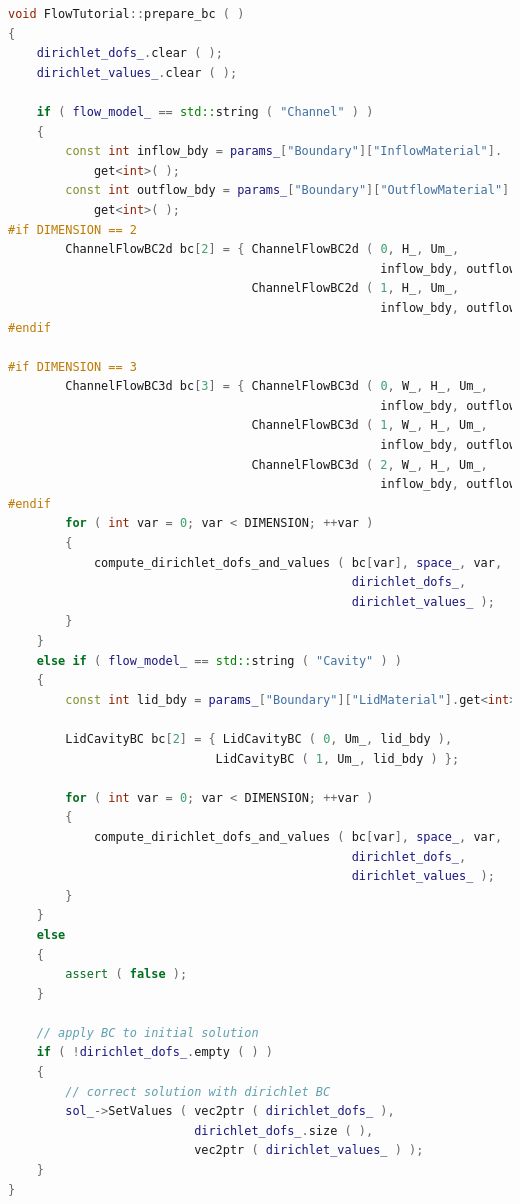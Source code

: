 \documentclass[a4paper, 11pt, twoside]{article}
\begin{document}
\begin{lstlisting}[language=C++, basicstyle={\footnotesize, \ttfamily}, keywordstyle=\color{blue},  numbers=none, tabsize=4]
void FlowTutorial::prepare_bc ( )
{
    dirichlet_dofs_.clear ( );
    dirichlet_values_.clear ( );

    if ( flow_model_ == std::string ( "Channel" ) )
    {
        const int inflow_bdy = params_["Boundary"]["InflowMaterial"].
            get<int>( );
        const int outflow_bdy = params_["Boundary"]["OutflowMaterial"].
            get<int>( );
#if DIMENSION == 2
        ChannelFlowBC2d bc[2] = { ChannelFlowBC2d ( 0, H_, Um_, 
                                                    inflow_bdy, outflow_bdy ),
                                  ChannelFlowBC2d ( 1, H_, Um_, 
                                                    inflow_bdy, outflow_bdy ) };
#endif

#if DIMENSION == 3
        ChannelFlowBC3d bc[3] = { ChannelFlowBC3d ( 0, W_, H_, Um_, 
                                                    inflow_bdy, outflow_bdy ),
                                  ChannelFlowBC3d ( 1, W_, H_, Um_, 
                                                    inflow_bdy, outflow_bdy ),
                                  ChannelFlowBC3d ( 2, W_, H_, Um_, 
                                                    inflow_bdy, outflow_bdy ) };
#endif
        for ( int var = 0; var < DIMENSION; ++var )
        {
            compute_dirichlet_dofs_and_values ( bc[var], space_, var,
                                                dirichlet_dofs_, 
                                                dirichlet_values_ );
        }
    }
    else if ( flow_model_ == std::string ( "Cavity" ) )
    {
        const int lid_bdy = params_["Boundary"]["LidMaterial"].get<int>( );

        LidCavityBC bc[2] = { LidCavityBC ( 0, Um_, lid_bdy ),
                             LidCavityBC ( 1, Um_, lid_bdy ) };

        for ( int var = 0; var < DIMENSION; ++var )
        {
            compute_dirichlet_dofs_and_values ( bc[var], space_, var,
                                                dirichlet_dofs_, 
                                                dirichlet_values_ );
        }
    }
    else
    {
        assert ( false );
    }

    // apply BC to initial solution
    if ( !dirichlet_dofs_.empty ( ) )
    {
        // correct solution with dirichlet BC
        sol_->SetValues ( vec2ptr ( dirichlet_dofs_ ), 
                          dirichlet_dofs_.size ( ),
                          vec2ptr ( dirichlet_values_ ) );
    }
}
\end{lstlisting}
\end{document}
